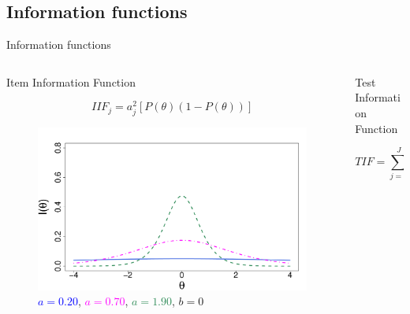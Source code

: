 \documentclass{beamer} %
\begin{document}
\subsection*{Information functions}
\begin{frame}{Information functions}
	\vspace*{-5mm}
	\begin{columns}[T]
		\begin{column}{.50\linewidth}
				\begin{center}
				Item Information Function
			\end{center}
			\begin{equation*}\label{eq:IIF}
			\mathit{IIF}_j = a_j^2[P(\theta)(1-P(\theta))]
		\end{equation*}
	\pause
	\vspace*{-4mm}
	\begin{figure}
		\centering
			\includegraphics[width=\linewidth]{img/iifs.pdf}
			\caption{\footnotesize{\textcolor{blue}{$a = 0.20$}, \textcolor{magenta}{$a = 0.70$}, 
			\textcolor{seagreen}{$a = 1.90$}, $b=0$}}
\label{sub:iif}
	\end{figure}
		\end{column}
\begin{column}{.50\linewidth}
	\pause
	\begin{center}
		Test Information Function
	\end{center}
	\begin{equation*}\label{eq:TIF}
	\mathit{TIF} = \displaystyle \sum_{j=1}^{J} \mathit{IIF}_j
\end{equation*}
\vspace*{-6mm}
\pause
\begin{figure}

\end{figure}
\end{column}
\end{columns}
\end{frame}
\end{document}
